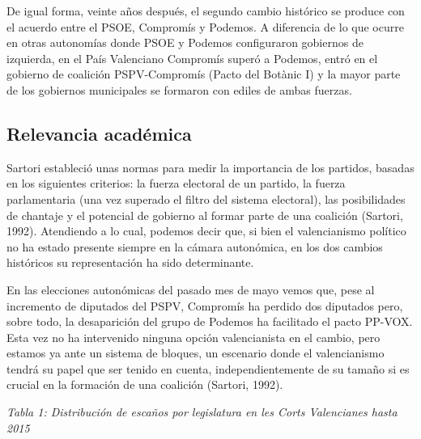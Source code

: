 \documentclass[
]{article}
\begin{document}
De igual forma, veinte años después, el segundo cambio histórico se
produce con el acuerdo entre el PSOE, Compromís y Podemos. A diferencia
de lo que ocurre en otras autonomías donde PSOE y Podemos configuraron
gobiernos de izquierda, en el País Valenciano Compromís superó a
Podemos, entró en el gobierno de coalición PSPV-Compromís (Pacto del
Botànic I) y la mayor parte de los gobiernos municipales se formaron con
ediles de ambas fuerzas.

\hypertarget{relevancia-acaduxe9mica}{%
\subsection{Relevancia académica}\label{relevancia-acaduxe9mica}}

Sartori estableció unas normas para medir la importancia de los
partidos, basadas en los siguientes criterios: la fuerza electoral de un
partido, la fuerza parlamentaria (una vez superado el filtro del sistema
electoral), las posibilidades de chantaje y el potencial de gobierno al
formar parte de una coalición (Sartori, 1992). Atendiendo a lo cual,
podemos decir que, si bien el valencianismo político no ha estado
presente siempre en la cámara autonómica, en los dos cambios históricos
su representación ha sido determinante.

En las elecciones autonómicas del pasado mes de mayo vemos que, pese al
incremento de diputados del PSPV, Compromís ha perdido dos diputados
pero, sobre todo, la desaparición del grupo de Podemos ha facilitado el
pacto PP-VOX. Esta vez no ha intervenido ninguna opción valencianista en
el cambio, pero estamos ya ante un sistema de bloques, un escenario
donde el valencianismo tendrá su papel que ser tenido en cuenta,
independientemente de su tamaño si es crucial en la formación de una
coalición (Sartori, 1992).

\emph{Tabla 1: Distribución de escaños por legislatura en les Corts
Valencianes hasta 2015}
\end{document}
